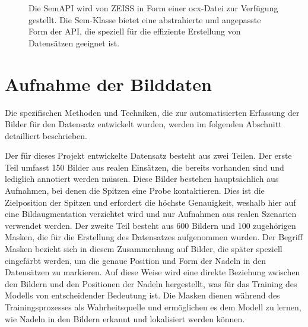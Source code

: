 \begin{figure}[h]
    \caption{Die SemAPI wird von ZEISS in Form einer ocx-Datei zur Verfügung gestellt. Die Sem-Klasse bietet eine abstrahierte und angepasste Form der API, die speziell für die effiziente Erstellung von Datensätzen geeignet ist.}
    \label{fig:semumldiag}
\end{figure}

\section{Aufnahme der Bilddaten}
Die spezifischen Methoden und Techniken, die zur automatisierten Erfassung der Bilder für den Datensatz entwickelt wurden, werden im folgenden Abschnitt detailliert beschrieben.

Der für dieses Projekt entwickelte Datensatz besteht aus zwei Teilen. Der erste Teil umfasst 150 Bilder aus realen Einsätzen, die bereits vorhanden sind und lediglich annotiert werden müssen. Diese Bilder bestehen hauptsächlich aus Aufnahmen, bei denen die Spitzen eine Probe kontaktieren. Dies ist die Zielposition der Spitzen und erfordert die höchste Genauigkeit, weshalb hier auf eine Bildaugmentation verzichtet wird und nur Aufnahmen aus realen Szenarien verwendet werden.
Der zweite Teil besteht aus 600 Bildern und 100 zugehörigen Masken, die für die Erstellung des Datensatzes aufgenommen wurden.
Der Begriff \glqq Masken\grqq{} bezieht sich in diesem Zusammenhang auf Bilder, die später speziell eingefärbt werden, um die genaue Position und Form der Nadeln in den Datensätzen zu markieren. Auf diese Weise wird eine direkte Beziehung zwischen den Bildern und den Positionen der Nadeln hergestellt, was für das Training des Modells von entscheidender Bedeutung ist. Die Masken dienen während des Trainingsprozesses als \glqq Wahrheitsquelle\grqq{} und ermöglichen es dem Modell zu lernen, wie Nadeln in den Bildern erkannt und lokalisiert werden können.

